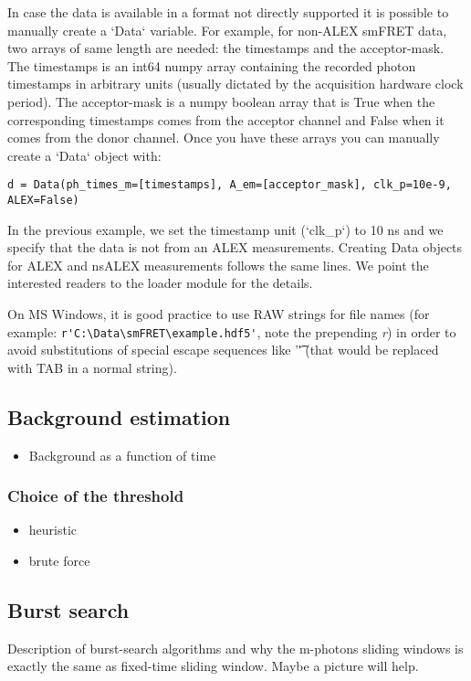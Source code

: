 In case the data is available in a format not directly supported it is possible to manually create a `Data` variable. For example, for non-ALEX smFRET data, two arrays of same length are needed: the timestamps and the acceptor-mask. The timestamps is an int64 numpy array containing the recorded photon timestamps in arbitrary units (usually dictated by the acquisition hardware clock period). The acceptor-mask is a numpy boolean array that is True when the corresponding timestamps comes from the acceptor channel and False when it comes from the donor channel. Once you have these arrays you can manually create a `Data` object with:

\verb|d = Data(ph_times_m=[timestamps], A_em=[acceptor_mask], clk_p=10e-9, ALEX=False)|

In the previous example, we set the timestamp unit (`clk_p`) to 10 ns and we specify that the data is not from an ALEX measurements. Creating Data objects for ALEX and nsALEX measurements follows the same lines. We point the interested readers to the loader module for the details.

On MS Windows, it is good practice to use RAW strings for file names (for example: \verb|r'C:\Data\smFRET\example.hdf5'|, note the prepending \textit{r}) in order to avoid substitutions of special escape sequences like '\t' (that would be replaced with TAB in a normal string).

\subsection{Background estimation}
\begin{itemize}
\item Background as a function of time
\end{itemize}

\subsubsection{Choice of the threshold}
\begin{itemize}
\item heuristic
\item brute force
\end{itemize}

\subsection{Burst search}

Description of burst-search algorithms and why the m-photons sliding windows is exactly the same as fixed-time sliding window. Maybe a picture will help.


